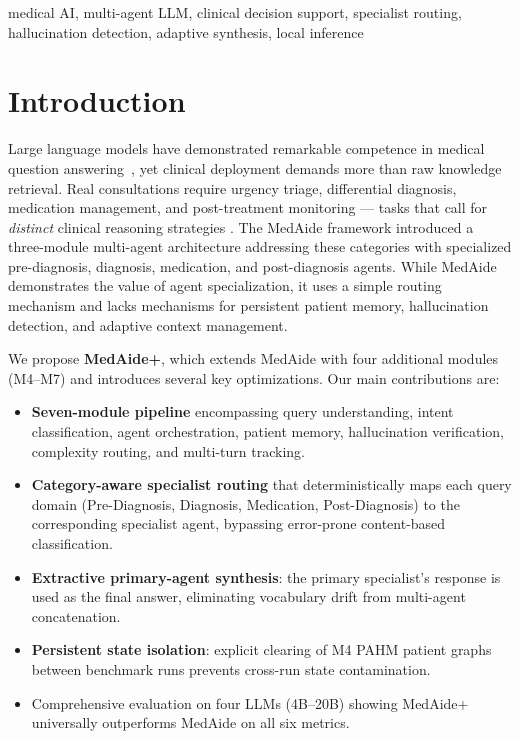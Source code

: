 \documentclass[conference]{IEEEtran}
\begin{document}
\begin{IEEEkeywords}
medical AI, multi-agent LLM, clinical decision support, specialist routing, 
hallucination detection, adaptive synthesis, local inference
\end{IEEEkeywords}

\section{Introduction}
\label{sec:intro}

Large language models have demonstrated remarkable competence in medical question
answering~\cite{singhal2023meditron,tian2023chimed,zhang2023huatuogpt}, yet clinical
deployment demands more than raw knowledge retrieval. Real consultations require urgency
triage, differential diagnosis, medication management, and post-treatment monitoring —
tasks that call for \emph{distinct} clinical reasoning strategies \cite{mediaide2024}.
The MedAide framework \cite{mediaide2024} introduced a three-module multi-agent
architecture addressing these categories with specialized pre-diagnosis, diagnosis,
medication, and post-diagnosis agents. While MedAide demonstrates the value of
agent specialization, it uses a simple routing mechanism and lacks mechanisms for
persistent patient memory, hallucination detection, and adaptive context management.

We propose \textbf{MedAide+}, which extends MedAide with four additional modules
(M4–M7) and introduces several key optimizations. Our main contributions are:

\begin{itemize}
  \item \textbf{Seven-module pipeline} encompassing query understanding, intent
    classification, agent orchestration, patient memory, hallucination verification,
    complexity routing, and multi-turn tracking.
  \item \textbf{Category-aware specialist routing} that deterministically maps each
    query domain (Pre-Diagnosis, Diagnosis, Medication, Post-Diagnosis) to the
    corresponding specialist agent, bypassing error-prone content-based classification.
  \item \textbf{Extractive primary-agent synthesis}: the primary specialist's response
    is used as the final answer, eliminating vocabulary drift from multi-agent
    concatenation.
  \item \textbf{Persistent state isolation}: explicit clearing of M4 PAHM patient
    graphs between benchmark runs prevents cross-run state contamination.
  \item Comprehensive evaluation on four LLMs (4B–20B) showing MedAide+ universally
    outperforms MedAide on all six metrics.
\end{itemize}
\end{document}
